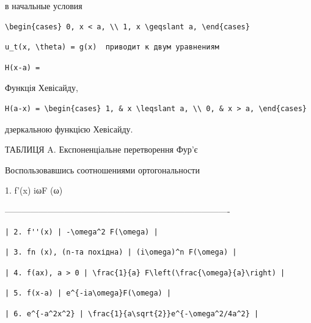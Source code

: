 \documentclass[
  ukrainian,
]{article}
\begin{document}
в начальные условия

\begin{verbatim}
\begin{cases} 0, x < a, \\ 1, x \geqslant a, \end{cases}
\end{verbatim}

\begin{verbatim}
u_t(x, \theta) = g(x)  приводит к двум уравнениям
\end{verbatim}

\begin{verbatim}
H(x-a) =
\end{verbatim}

Функція Хевісайду,

\begin{verbatim}
H(a-x) = \begin{cases} 1, & x \leqslant a, \\ 0, & x > a, \end{cases}
\end{verbatim}

дзеркальною функцією Хевісайду.

ТАБЛИЦЯ A. Експоненціальне перетворення Фур'є

Воспользовавшись соотношениями ортогональности

1. f'(x) \textbar{} iωF (ω) \textbar{}

\textbar------------------------------\textbar-------------------------------------------------\textbar{}

\begin{verbatim}
| 2. f''(x) | -\omega^2 F(\omega) |
\end{verbatim}

\begin{verbatim}
| 3. fn (x), (n-та похідна) | (i\omega)^n F(\omega) |
\end{verbatim}

\begin{verbatim}
| 4. f(ax), a > 0 | \frac{1}{a} F\left(\frac{\omega}{a}\right) |
\end{verbatim}

\begin{verbatim}
| 5. f(x-a) | e^{-ia\omega}F(\omega) |
\end{verbatim}

\begin{verbatim}
| 6. e^{-a^2x^2} | \frac{1}{a\sqrt{2}}e^{-\omega^2/4a^2} |
\end{verbatim}
\end{document}

